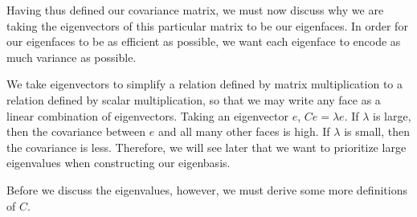 \documentclass[12pt]{report}
\begin{document}

    
            
            Having thus defined our covariance matrix, we must now discuss why we are taking the eigenvectors of this particular matrix to be our eigenfaces. In order for our eigenfaces to be as efficient as possible, we want each eigenface to encode as much variance as possible. 
            
            We take eigenvectors to simplify a relation defined by matrix multiplication to a relation defined by scalar multiplication, so that we may write any face as a linear combination of eigenvectors. Taking an eigenvector $e$, $C e = \lambda e$. If $\lambda$ is large, then the covariance between $e$ and all many other faces is high. If $\lambda$ is small, then the covariance is less. Therefore, we will see later that we want to prioritize large eigenvalues when constructing our eigenbasis. 
            
            Before we discuss the eigenvalues, however, we must derive some more definitions of $C$.
            
\end{document}
